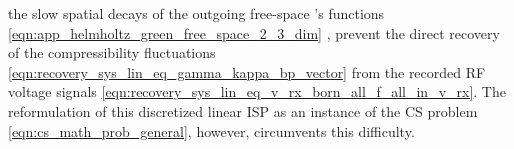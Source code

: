 the slow spatial decays of
the outgoing free-space 's functions
\eqref{eqn:app_helmholtz_green_free_space_2_3_dim}
\cite{article:ChewITAP1997,article:RokhlinJCP1990}, prevent
the direct recovery of
the compressibility fluctuations
\eqref{eqn:recovery_sys_lin_eq_gamma_kappa_bp_vector} from
the recorded \ac{RF} voltage signals
\eqref{eqn:recovery_sys_lin_eq_v_rx_born_all_f_all_in_v_rx}.
The reformulation of
this discretized linear \ac{ISP} as
an instance of
the \ac{CS} problem
\eqref{eqn:cs_math_prob_general}, however, circumvents
this difficulty.
